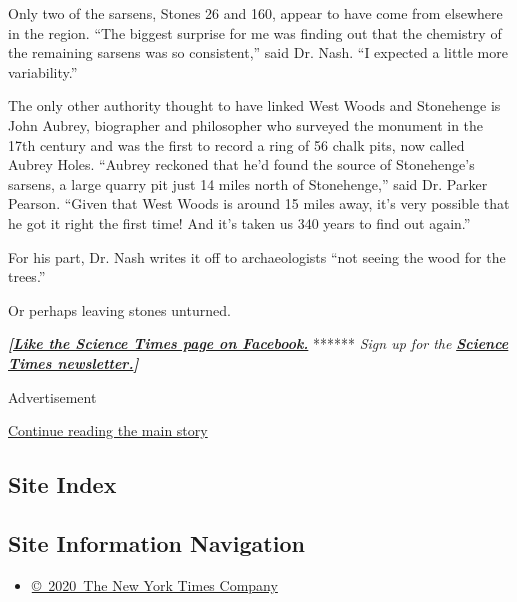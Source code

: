 Only two of the sarsens, Stones 26 and 160, appear to have come from
elsewhere in the region. ``The biggest surprise for me was finding out
that the chemistry of the remaining sarsens was so consistent,'' said
Dr. Nash. ``I expected a little more variability.''

The only other authority thought to have linked West Woods and
Stonehenge is John Aubrey, biographer and philosopher who surveyed the
monument in the 17th century and was the first to record a ring of 56
chalk pits, now called Aubrey Holes. ``Aubrey reckoned that he'd found
the source of Stonehenge's sarsens, a large quarry pit just 14 miles
north of Stonehenge,'' said Dr. Parker Pearson. ``Given that West Woods
is around 15 miles away, it's very possible that he got it right the
first time! And it's taken us 340 years to find out again.''

For his part, Dr. Nash writes it off to archaeologists ``not seeing the
wood for the trees.''

Or perhaps leaving stones unturned.

\textbf{\emph{{[}}\href{http://on.fb.me/1paTQ1h}{\emph{Like the Science
Times page on Facebook.}}} ****** \emph{\textbar{} Sign up for the}
\textbf{\href{http://nyti.ms/1MbHaRU}{\emph{Science Times
newsletter.}}\emph{{]}}}

Advertisement

\protect\hyperlink{after-bottom}{Continue reading the main story}

\hypertarget{site-index}{%
\subsection{Site Index}\label{site-index}}

\hypertarget{site-information-navigation}{%
\subsection{Site Information
Navigation}\label{site-information-navigation}}

\begin{itemize}
\tightlist
\item
  \href{https://help.nytimes.com/hc/en-us/articles/115014792127-Copyright-notice}{©~2020~The
  New York Times Company}
\end{itemize}

